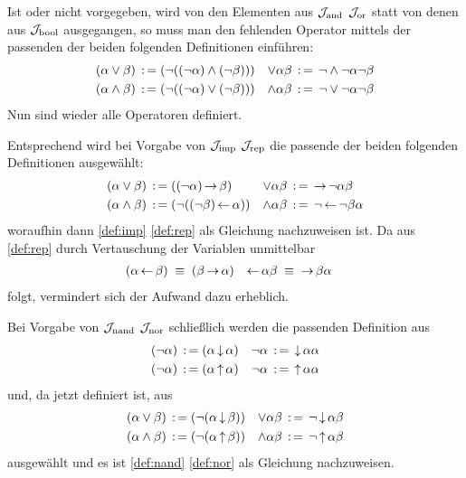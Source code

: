 Ist \symqt{$\lor$} oder \symqt{$\land$} nicht vorgegeben, \textdh wird von den Elementen aus $\mathcal{J}_{\mathrm{and}}$ \textbzw $\mathcal{J}_{\mathrm{or}}$ statt von denen aus $\mathcal{J}_{\mathrm{bool}}$ ausgegangen, so muss man den fehlenden Operator mittels der passenden der beiden folgenden Definitionen einführen:
\begin{align}
	(\alpha \lor \beta)  & \;\operatorname{:=}\; (\lnot((\lnot\alpha)\land(\lnot\beta))) &
	\lor \alpha  \beta   & \;\operatorname{:=}\;  \lnot \land \lnot \alpha \lnot \beta
	\label{def:orand} \\
	(\alpha \land \beta) & \;\operatorname{:=}\; (\lnot((\lnot\alpha)\lor(\lnot\beta)))  &
	\land \alpha  \beta  & \;\operatorname{:=}\;  \lnot \lor \lnot \alpha \lnot \beta
	\label{def:andor}
\end{align}
Nun sind wieder alle Operatoren definiert.

Entsprechend wird bei Vorgabe von $\mathcal{J}_{\mathrm{imp}}$ \textbzw $\mathcal{J}_{\mathrm{rep}}$ die passende der beiden folgenden Definitionen ausgewählt:
\begin{align}
	(\alpha \lor  \beta) & \;\operatorname{:=}\; ((\lnot \alpha) \operatorname{\rightarrow} \beta)         &
	\lor \alpha   \beta  & \;\operatorname{:=}\;   \operatorname{\rightarrow} \lnot \alpha \beta
	\label{def:orrep}
	\\
	(\alpha \land \beta) & \;\operatorname{:=}\; (\lnot ((\lnot \beta) \operatorname{\leftarrow} \alpha)) &
	\land \alpha  \beta  & \;\operatorname{:=}\;  \lnot \operatorname{\leftarrow} \lnot \beta \alpha
	\label{def:andrep}
\end{align}
woraufhin dann \eqref{def:imp} \textbzw \eqref{def:rep} als Gleichung nachzuweisen ist.
Da aus \eqref{def:rep} durch Vertauschung der Variablen unmittelbar
\begin{align}
	(\alpha \operatorname{\leftarrow} \beta) & \;\equiv\; (\beta \operatorname{\rightarrow} \alpha) &
	\operatorname{\leftarrow} \alpha  \beta  & \;\equiv\;  \operatorname{\rightarrow} \beta \alpha  \label{eq:repimp}
\end{align}
folgt, vermindert sich der Aufwand dazu erheblich.

Bei Vorgabe von $\mathcal{J}_{\mathrm{nand}}$ \textbzw $\mathcal{J}_{\mathrm{nor}}$ schließlich werden die passenden Definition aus
\begin{align}
	(\lnot \alpha) & \;\operatorname{:=}\; (\alpha \operatorname{\downarrow} \alpha)  &
	\lnot  \alpha  & \;\operatorname{:=}\;  \operatorname{\downarrow} \alpha \alpha   \label{def:notnor} \\
	(\lnot \alpha) & \;\operatorname{:=}\; (\alpha \operatorname{\uparrow} \alpha) &
	\lnot  \alpha  & \;\operatorname{:=}\;  \operatorname{\uparrow} \alpha \alpha  \label{def:notnand}
\end{align}
und, da \symqt{$\lnot$} jetzt definiert ist, aus
\begin{align}
	(\alpha \lor \beta)  & \;\operatorname{:=}\; (\lnot(\alpha \operatorname{\downarrow} \beta))  &
	\lor \alpha  \beta   & \;\operatorname{:=}\;  \lnot \operatorname{\downarrow} \alpha \beta
	\label{def:ornor} \\
	(\alpha \land \beta) & \;\operatorname{:=}\; (\lnot(\alpha \operatorname{\uparrow} \beta)) &
	\land \alpha  \beta  & \;\operatorname{:=}\;  \lnot \operatorname{\uparrow} \alpha \beta
	\label{def:andnand}
\end{align}
ausgewählt und es ist \eqref{def:nand} \textbzw \eqref{def:nor} als Gleichung nachzuweisen.

